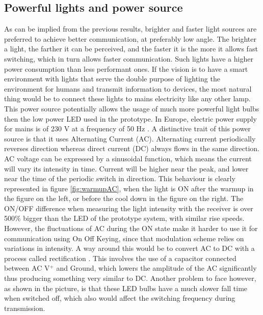 \subsection{Powerful lights and power source}
\label{acphy}
As can be implied from the previous results, brighter and faster light sources are preferred to achieve better communication, at preferably low angle. The brighter a light, the farther it can be perceived, and the faster it is the more it allows fast switching, which in turn allows faster communication.
Such lights have a higher power consumption than less performant ones.
If the vision is to have a smart environment with lights that serve the double purpose of lighting the environment for humans and transmit information to devices, the most natural thing would be to connect these lights to mains electricity like any other lamp.
This power source potentially allows the usage of much more powerful light bulbs then the low power LED used in the prototype.
In Europe, electric power supply for mains is of 230 V at a frequency of 50 Hz .
A distinctive trait of this power source is that it uses Alternating Current (AC).
Alternating current periodically reverses direction whereas direct current (DC) always flows in the same direction.
AC voltage can be expressed by a sinusoidal function, which means the current will vary its intensity in time.
Current will be higher near the peak, and lower near the time of the periodic switch in direction. 
This behaviour is clearly represented in figure \ref{fig:warmupAC}, when the light is ON after the warmup in the figure on the left, or before the cool down in the figure on the right.
The ON/OFF difference when measuring the light intensity with the receiver is over 500\% bigger than the LED of the prototype system, with similar rise speeds.
However, the fluctuations of AC during the ON state make it harder to use it for communication using On Off Keying, since that modulation scheme relies on variations in intensity.
A way around this would be to convert AC to DC with a process called rectification .
This involves the use of a capacitor connected between AC V$^{+}$ and Ground,  which lowers the amplitude of the AC significantly thus producing something very similar to DC.
Another problem to face however, as shown in the picture, is that these LED bulbs have a much slower fall time when switched off, which also would affect the switching frequency during transmission.

